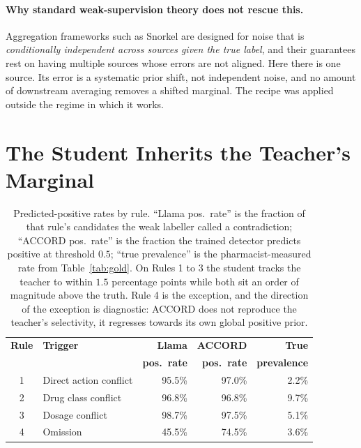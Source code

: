 \paragraph{Why standard weak-supervision theory does not rescue this.}
Aggregation frameworks such as Snorkel \citep{ratner2017snorkel} are designed for
noise that is \emph{conditionally independent across sources given the true
label}, and their guarantees rest on having multiple sources whose errors are
not aligned. Here there is one source. Its error is a systematic prior shift, not
independent noise, and no amount of downstream averaging removes a shifted
marginal. The recipe was applied outside the regime in which it works.

\section{The Student Inherits the Teacher's Marginal}
\label{sec:weak-tracking}

\begin{table}[t]
\centering
\small
\begin{tabular}{clrrr}
\toprule
\textbf{Rule} & \textbf{Trigger} & \textbf{Llama} & \textbf{ACCORD} & \textbf{True} \\
              &                  & \textbf{pos.\ rate} & \textbf{pos.\ rate} & \textbf{prevalence} \\
\midrule
1 & Direct action conflict & 95.5\% & 97.0\% & 2.2\% \\
2 & Drug class conflict    & 96.8\% & 96.8\% & 9.7\% \\
3 & Dosage conflict        & 98.7\% & 97.5\% & 5.1\% \\
4 & Omission               & 45.5\% & 74.5\% & 3.6\% \\
\bottomrule
\end{tabular}
\caption{Predicted-positive rates by rule. ``Llama pos.\ rate'' is the fraction
of that rule's candidates the weak labeller called a contradiction; ``ACCORD
pos.\ rate'' is the fraction the trained detector predicts positive at threshold
$0.5$; ``true prevalence'' is the pharmacist-measured rate from
Table~\ref{tab:gold}. On Rules 1 to 3 the student tracks the teacher to within
$1.5$ percentage points while both sit an order of magnitude above the truth.
Rule 4 is the exception, and the direction of the exception is diagnostic:
ACCORD does not reproduce the teacher's selectivity, it regresses towards its
own global positive prior.}
\label{tab:tracking}
\end{table}

